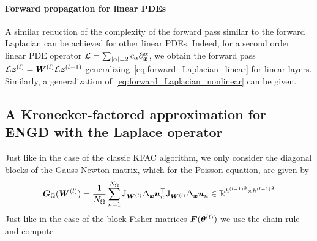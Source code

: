 \paragraph{Forward propagation for linear PDEs}
A similar reduction of the complexity of the forward pass similar to the forward Laplacian can be achieved for other linear PDEs.
Indeed, for a second order linear PDE operator $\mathcal L = \sum_{\lvert \alpha \rvert=2}c_\alpha \partial^\alpha_{\bm{x}}$, we obtain the forward pass $\mathcal L {\bm{z}}^{(l)} = {\bm{W}}^{(l)}\mathcal L {\bm{z}}^{(l-1)}$ generalizing~\eqref{eq:forward_Laplacian_linear} for linear layers.
Similarly, a generalization of~\eqref{eq:forward_Laplacian_nonlinear} can be given.


\subsection{A Kronecker-factored approximation for ENGD with the Laplace operator}\label{sec:KFAC-Laplace}
Just like in the case of the classic KFAC algorithm, we only consider the diagonal blocks of the Gauss-Newton matrix, which for the Poisson equation, are given by
\begin{align}
    {\bm{G}}_\Omega({\bm{W}}^{(l)}) = \frac1{{N_\Omega}} \sum_{n=1}^{N_\Omega} \mathrm{J}_{{\bm{W}}^{(l)}} \Delta_{\bm{x}} {\bm{u}}_n^\top \mathrm{J}_{{\bm{W}}^{(l)}} \Delta_{\bm{x}} {\bm{u}}_n \in\mathbb R^{{h^{(l-1)}}^2\times {h^{(l-1)}}^2}
\end{align}
Just like in the case of the block Fisher matrices ${\bm{F}}({\bm{\theta}}^{(l)})$ we use the chain rule and compute
